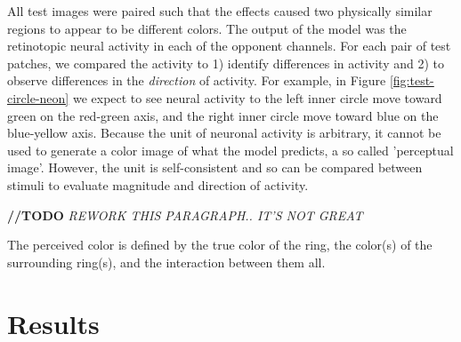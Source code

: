\documentclass[journal,onecolumn]{IEEEtran}
\begin{document}
 All test images were paired such that the effects caused two physically similar regions to appear to be different colors. The output of the model was the retinotopic neural activity in each of the opponent channels. For each pair of test patches, we compared the activity to 1) identify differences in activity and 2) to observe differences in the \textit{direction} of activity. For example, in Figure \ref{fig:test-circle-neon} we expect to see neural activity to the left inner circle move toward green on the red-green axis, and the right inner circle move toward blue on the blue-yellow axis. Because the unit of neuronal activity is arbitrary, it cannot be used to generate a color image of what the model predicts, a so called 'perceptual image'. However, the unit is self-consistent and so can be compared between stimuli to evaluate magnitude and direction of activity.

\textbf{//TODO} \textit{REWORK THIS PARAGRAPH.. IT'S NOT GREAT}

The perceived color is defined by the true color of the ring, the color(s) of the surrounding ring(s), and the interaction between them all.


%
%
%
\section{Results}
\end{document}
